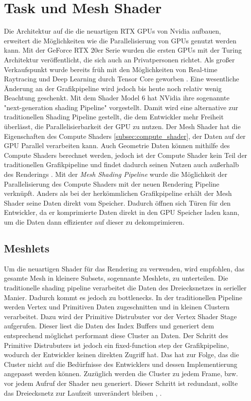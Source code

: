 \section{Task und Mesh Shader}
Die Architektur auf die die neuartigen RTX GPUs von Nvidia aufbauen, erweitert die Möglichkeiten wie die Parallelisierung von GPUs genutzt werden kann.
Mit der GeForce RTX 20er Serie wurden die ersten GPUs mit der Turing Architektur veröffentlicht, die sich auch an Privatpersonen richtet.
Als großer Verkaufspunkt wurde bereits früh mit den Möglichkeiten von Real-time Raytracing und Deep Learning durch Tensor Core geworben \cite{Burgess2020}. 
Eine wesentliche Änderung an der Grafikpipeline wird jedoch bis heute noch relativ wenig Beachtung geschenkt.
Mit dem Shader Model 6 hat NVidia ihre sogenannte "next-generation shading Pipeline" vorgestellt.
Damit wird eine alternative zur traditionellen Shading Pipeline gestellt, die dem Entwickler mehr Freiheit überlässt, die Parallelisierbarkeit der GPU zu nutzen.
Der Mesh Shader hat die Eigenschaften des Compute Shaders \ref{subsec:compute_shader}, der Daten auf der GPU Parallel verarbeiten kann.
Auch Geometrie Daten können mithilfe des Compute Shaders berechnet werden, jedoch ist der Compute Shader kein Teil der traditionellen Grafikpipeline und findet dadurch seinen Nutzen auch außerhalb des Renderings \cite{Ilett2022}.
Mit der \textit{Mesh Shading Pipeline} wurde die Möglichkeit der Parallelisierung des Compute Shaders mit der neuen Rendering Pipeline verknüpft.
Anders als bei der herkömmlichen Grafikpipeline erhält der Mesh Shader seine Daten direkt vom Speicher. 
Dadurch öffnen sich Türen für den Entwickler, da er komprimierte Daten direkt in den GPU Speicher laden kann, um die Daten dann effizienter auf dieser zu dekomprimieren.


\subsection{Meshlets}
\label{subsec:meshlets}
Um die neuartigen Shader für das Rendering zu verwenden, wird empfohlen, das gesamte Mesh in kleinere Subsets, sogennante Meshlets, zu unterteilen. 
Die traditionelle shading pipeline verarbeitet die Daten des Dreiecksnetzes in serieller Manier. 
Dadurch kommt es jedoch zu bottlenecks.
In der traditionellen Pipeline werden Vertex und Primitiven Daten zugeschnitten und in kleinen Clustern verarbeitet.
Dazu wird der Primitive Distrubuter vor der Vertex Shader Stage aufgerufen.
Dieser liest die Daten des Index Buffers und generiert dem entsprechend möglichst performant diese Cluster an Daten.
Der Schritt des Primitive Distrubuters ist jedoch ein fixed-function step der Grafikpipeline, wodurch der Entwickler keinen direkten Zugriff hat.
Das hat zur Folge, das die Cluster nicht auf die Bedürfnisse des Entwicklers und dessen Implementierung angepasst werden können.
Zuzüglich werden die Cluster zu jedem Frame, bzw. vor jedem Aufruf der Shader neu generiert.
Dieser Schritt ist redundant, sollte das Dreiecksnetz zur Laufzeit unverändert bleiben \cite{Carvalho2022}, \cite{Kubisch2018}. \newline

